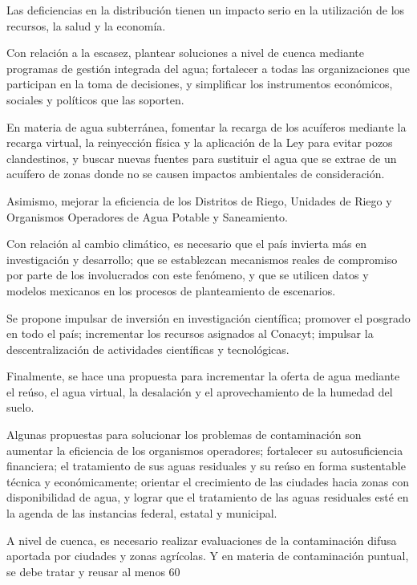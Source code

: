 Las deficiencias en la distribución tienen un impacto serio en la utilización de los recursos, la salud y la economía.

Con relación a la escasez, plantear soluciones a nivel de cuenca mediante programas de gestión integrada del agua; fortalecer a todas las organizaciones que
participan en la toma de decisiones, y simplificar los instrumentos económicos, sociales y políticos que las soporten.

En materia de agua subterránea, fomentar la recarga de los acuíferos mediante
la recarga virtual, la reinyección física y la aplicación de la Ley para evitar pozos
clandestinos, y buscar nuevas fuentes para sustituir el agua que se extrae de un
acuífero de zonas donde no se causen impactos ambientales de consideración.

Asimismo, mejorar la eficiencia de los Distritos de Riego, Unidades de Riego y
Organismos Operadores de Agua Potable y Saneamiento.

Con relación al cambio climático, es necesario que el país invierta más en investigación y desarrollo; que se establezcan mecanismos reales de compromiso por parte de los involucrados con este fenómeno, y que se utilicen datos y modelos mexicanos en los procesos de planteamiento de escenarios.

Se propone impulsar de inversión en investigación científica; promover el posgrado en todo el país; incrementar los recursos asignados al Conacyt; impulsar la descentralización de actividades científicas y tecnológicas.

Finalmente, se hace una propuesta para incrementar la oferta de agua mediante el reúso, el agua virtual, la desalación y el aprovechamiento de la humedad del suelo.

Algunas propuestas para solucionar los problemas de contaminación son aumentar la eficiencia de los organismos operadores; fortalecer su autosuficiencia financiera; el tratamiento de sus aguas residuales y su reúso en forma sustentable técnica y económicamente; orientar el crecimiento de las ciudades hacia zonas con disponibilidad de agua, y lograr que el tratamiento de las aguas residuales esté en la agenda de las instancias federal, estatal y municipal.

A nivel de cuenca, es necesario realizar evaluaciones de la contaminación difusa aportada por ciudades y zonas agrícolas. Y en materia de contaminación puntual, se debe tratar y reusar al menos 60 %


